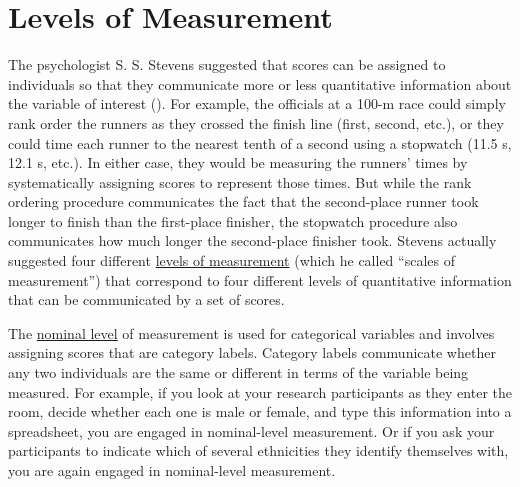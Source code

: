 \documentclass[
]{krantz}
\begin{document}
\section{Levels of Measurement}\label{levels-of-measurement}

The psychologist S. S. Stevens suggested that scores can be assigned to individuals so that they communicate more or less quantitative information about the variable of interest (). For example, the officials at a 100-m race could simply rank order the runners as they crossed the finish line (first, second, etc.), or they could time each runner to the nearest tenth of a second using a stopwatch (11.5 s, 12.1 s, etc.). In either case, they would be measuring the runners' times by systematically assigning scores to represent those times. But while the rank ordering procedure communicates the fact that the second-place runner took longer to finish than the first-place finisher, the stopwatch procedure also communicates how much longer the second-place finisher took. Stevens actually suggested four different \hyperref[levels-of-measurement]{levels of measurement} (which he called ``scales of measurement'') that correspond to four different levels of quantitative information that can be communicated by a set of scores.

The \hyperref[nominal-level]{nominal level} of measurement is used for categorical variables and involves assigning scores that are category labels. Category labels communicate whether any two individuals are the same or different in terms of the variable being measured. For example, if you look at your research participants as they enter the room, decide whether each one is male or female, and type this information into a spreadsheet, you are engaged in nominal-level measurement. Or if you ask your participants to indicate which of several ethnicities they identify themselves with, you are again engaged in nominal-level measurement.
\end{document}
